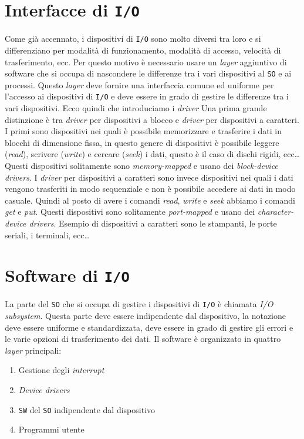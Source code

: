 \section{Interfacce di \texttt{I/O}}
    Come già accennato, i dispositivi di \texttt{I/O} sono molto diversi tra loro e si differenziano per modalità di funzionamento, modalità di accesso, velocità di trasferimento, ecc. Per questo motivo è necessario usare un \textit{layer} aggiuntivo di software che si occupa di nascondere le differenze tra i vari dispositivi al \texttt{SO} e ai processi.\newline
    Questo \textit{layer} deve fornire una interfaccia comune ed uniforme per l'accesso ai dispositivi di \texttt{I/O} e deve essere in grado di gestire le differenze tra i vari dispositivi. Ecco quindi che introduciamo i \textit{driver}\newline
    Una prima grande distinzione è tra \textit{driver} per dispositivi a blocco e \textit{driver} per dispositivi a caratteri. I primi sono dispositivi nei quali è possibile memorizzare e trasferire i dati in blocchi di dimensione fissa, in questo genere di dispositivi è possibile leggere (\textit{read}), scrivere (\textit{write}) e cercare (\textit{seek}) i dati, questo è il caso di dischi rigidi, ecc\dots Questi dispositivi solitamente sono \textit{memory-mapped} e usano dei \textit{block-device drivers}.\newline
    I \textit{driver} per dispositivi a caratteri sono invece dispositivi nei quali i dati vengono trasferiti in modo sequenziale e non è possibile accedere ai dati in modo casuale. Quindi al posto di avere i comandi \textit{read}, \textit{write} e \textit{seek} abbiamo i comandi \textit{get} e \textit{put}. Questi dispositivi sono solitamente \textit{port-mapped} e usano dei \textit{character-device drivers}. Esempio di dispositivi a caratteri sono le stampanti, le porte seriali, i terminali, ecc\dots
\section{Software di \texttt{I/O}}
    La parte del \texttt{SO} che si occupa di gestire i dispositivi di \texttt{I/O} è chiamata \textit{I/O subsystem}. Questa parte deve essere indipendente dal dispositivo, la notazione deve essere uniforme e standardizzata, deve essere in grado di gestire gli errori e le varie opzioni di trasferimento dei dati. Il software è organizzato in quattro \textit{layer} principali:
    \begin{enumerate}
        \item Gestione degli \textit{interrupt}
        \item \textit{Device drivers}
        \item \texttt{SW} del \texttt{SO} indipendente dal dispositivo
        \item Programmi utente
    \end{enumerate}

